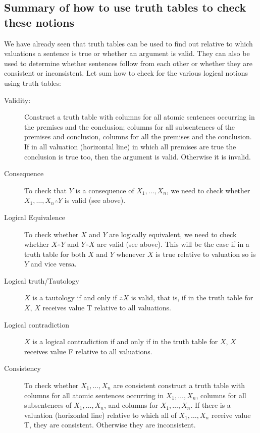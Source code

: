 %
%
%

\subsection{Summary of how to use truth tables to check these notions}
We have already seen that truth tables can be used to find out relative to which valuations a sentence is true or whether an argument is valid. They can also be used to determine whether sentences follow from each other or whether they are consistent or inconsistent. Let sum how to check for the various logical notions using truth tables:

\begin{description}
\item[Validity:]Construct a truth table with columns for all atomic sentences occurring in the premises and the conclusion; columns for all subsentences of the premises and conclusion, columns for all the premises and the conclusion. If in all valuation (horizontal line) in which all premises are true the conclusion is true too, then the argument is valid. Otherwise it is invalid.
\item[Consequence]To check that $Y$ is a consequence of $X_1,\ldots,X_n$, we need to check whether $X_1,\ldots,X_n\therefore Y$ is valid (see above).
\item[Logical Equivalence] To check whether $X$ and $Y$ are logically equivalent, we need to check whether $X\therefore Y$ and $Y\therefore X$ are valid (see above). This will be the case if in a truth table for both $X$ and $Y$ whenever $X$ is true relative to valuation so is $Y$ and vice versa.
\item[Logical truth/Tautology] $X$ is a tautology if and only if $\therefore X$ is valid, that is, if in the truth table for $X$, $X$ receives value T relative to all valuations.
\item[Logical contradiction]  $X$ is a logical contradiction if and only if in the truth table for $X$, $X$ receives value F relative to all valuations.
\item[Consistency]To check whether $X_1,\ldots,X_n$ are consistent construct a truth table with columns for all atomic sentences occurring in $X_1,\ldots,X_n$, columns for all subsentences of $X_1,\ldots,X_n$, and columns for $X_1,\ldots,X_n$. If there is a valuation (horizontal line) relative to which all of $X_1,\ldots,X_n$ receive value T, they are consistent. Otherwise they are inconsistent.
\end{description}

